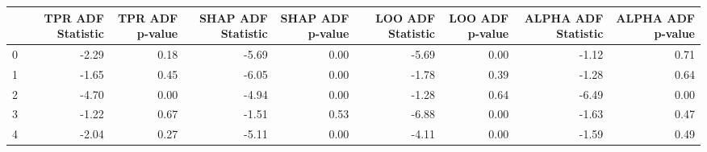 \begin{tabular}{lrrrrrrrr}
\toprule
 & TPR ADF Statistic & TPR ADF p-value & SHAP ADF Statistic & SHAP ADF p-value & LOO ADF Statistic & LOO ADF p-value & ALPHA ADF Statistic & ALPHA ADF p-value \\
\midrule
0 & -2.29 & 0.18 & -5.69 & 0.00 & -5.69 & 0.00 & -1.12 & 0.71 \\
1 & -1.65 & 0.45 & -6.05 & 0.00 & -1.78 & 0.39 & -1.28 & 0.64 \\
2 & -4.70 & 0.00 & -4.94 & 0.00 & -1.28 & 0.64 & -6.49 & 0.00 \\
3 & -1.22 & 0.67 & -1.51 & 0.53 & -6.88 & 0.00 & -1.63 & 0.47 \\
4 & -2.04 & 0.27 & -5.11 & 0.00 & -4.11 & 0.00 & -1.59 & 0.49 \\
\bottomrule
\end{tabular}
